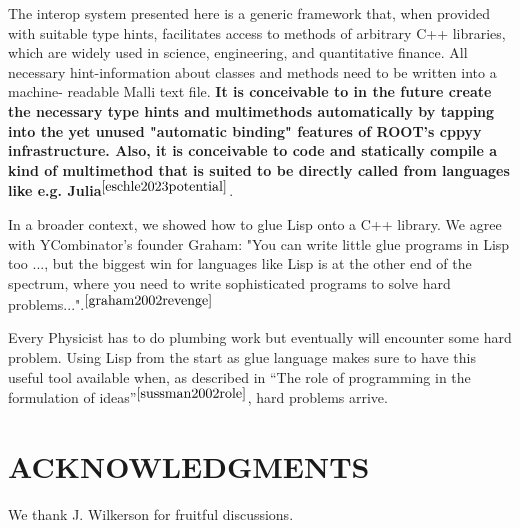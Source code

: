 \documentclass[twocolumn]{article}
\begin{document}
The interop system presented here is a generic framework that, when provided with suitable type hints, facilitates access to methods of arbitrary C++ libraries, which are widely used in science, engineering, and quantitative finance. All necessary hint-information about classes and methods need to be written into a machine- readable Malli text file. \textbf{It is conceivable to in the future create the necessary type hints and multimethods automatically by tapping into the yet unused "automatic binding" features of ROOT's cppyy infrastructure. Also, it is conceivable to code and statically compile a kind of multimethod that is suited to be directly called from languages like e.g. Julia}$^{\cite{eschle2023potential}}$.

In a broader context, we showed how to glue Lisp onto a C++ library. We agree with YCombinator's founder Graham: "You can write little glue programs in Lisp too ..., but the biggest win for languages like Lisp is at the other end of the spectrum, where you need to write sophisticated programs to solve hard problems...".$^{\cite{graham2002revenge}}$

Every Physicist has to do plumbing work but eventually will encounter some  hard problem. Using Lisp from the start as glue language makes sure to have this useful tool available when, as described in “The role of programming in the formulation of ideas”$^{\cite{sussman2002role}}$, hard problems arrive.

\section{ACKNOWLEDGMENTS}
We thank J. Wilkerson for fruitful discussions.


\end{document}
